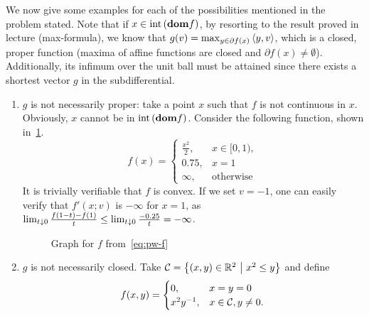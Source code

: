 \documentclass[10pt]{article}
\begin{document}
\begin{Exercise}
    We now give some examples for each of the possibilities mentioned in the
    problem stated. Note that if $x \in \mathrm{int}\left( \textbf{dom} f \right)$, by resorting to the
    result proved in lecture (max-formula), we know that $g(v) =
    \max_{y \in \partial f(x)} \left\langle y, v \right\rangle$, which is a closed, proper function
    (maxima of affine functions are closed and $\partial f(x)
    \neq \emptyset$). Additionally, its infimum over the unit ball must be
    attained since there exists a shortest vector $g$ in the subdifferential.
    \begin{enumerate}
    \item $g$ is not necessarily proper: take a point $x$ such that $f$ is not
    continuous in $x$. Obviously, $x$ cannot be in $\mathrm{int}\left( \textbf{dom} f \right)$. Consider
    the following function, shown in~\cref{fig:pw-f}.
    \begin{equation}
        f(x) = \begin{cases}
            \frac{x^2}{2}, & x \in [0, 1), \\
            0.75, & x = 1 \\
            \infty, & \text{otherwise}
        \end{cases}
        \label{eq:pw-f}
    \end{equation}
    It is trivially verifiable that $f$ is convex. If we set $v = -1$, one can
    easily verify that $f'(x; v)$ is $-\infty$ for $x = 1$, as $\lim_{t \downarrow 0}
    \frac{f(1 - t) - f(1)}{t} \leq \lim_{t \downarrow 0} \frac{-0.25}{t} = -\infty$.
    \begin{figure}[h]
        \centering
        \caption{Graph for $f$ from~\cref{eq:pw-f}}
        \label{fig:pw-f}
    \end{figure}
    \item $g$ is not necessarily closed. Take $\mathcal{C} = \left\{ (x, y) \in \mathbb{R}^2
        \ \middle| \  x^2 \leq y \right\}$ and define
        \[
            f(x, y) = \begin{cases}
                0, & x = y = 0 \\
                x^2y^{-1}, & x \in \mathcal{C}, y \neq 0.

\end{cases}\]
\end{enumerate}
\end{Exercise}
\end{document}
